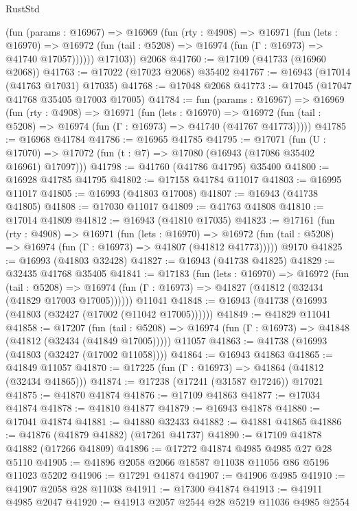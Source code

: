 \begin{lexlean}{RustStd}
\begin{coremodule}
          (fun (params : @16967) =>
          @16969
            (fun (rty : @4908) =>
            @16971
              (fun (lets : @16970) =>
              @16972 (fun (tail : @5208) => @16974 (fun (Γ : @16973) => @41740 @17057))))))
        @17103))
    @2068
@41760 := @17109 (@41733 (@16960 @2068))
@41763 := @17022 (@17023 @2068) @35402
@41767 := @16943 (@17014 (@41763 @17031) @17035)
@41768 := @17048 @2068
@41773 := @17045 (@17047 @41768 @35405 @17003 @17005)
@41784 := fun (params : @16967) =>
  @16969
    (fun (rty : @4908) =>
    @16971
      (fun (lets : @16970) =>
      @16972 (fun (tail : @5208) => @16974 (fun (Γ : @16973) => @41740 (@41767 @41773)))))
@41785 := @16968 @41784
@41786 := @16965 @41785
@41795 := @17071
    (fun (U : @17070) => @17072 (fun (t : @7) => @17080 (@16943 (@17086 @35402 @16961) @17097)))
@41798 := @41760 (@41786 @41795) @35400
@41800 := @16928 @41785 @41795
@41802 := @17158 @41784 @11017
@41803 := @16995 @11017
@41805 := @16993 (@41803 @17008)
@41807 := @16943 (@41738 @41805)
@41808 := @17030 @11017
@41809 := @41763 @41808
@41810 := @17014 @41809
@41812 := @16943 (@41810 @17035)
@41823 := @17161
    (fun (rty : @4908) =>
    @16971
      (fun (lets : @16970) =>
      @16972 (fun (tail : @5208) => @16974 (fun (Γ : @16973) => @41807 (@41812 @41773)))))
    @9170
@41825 := @16993 (@41803 @32428)
@41827 := @16943 (@41738 @41825)
@41829 := @32435 @41768 @35405
@41841 := @17183
    (fun (lets : @16970) =>
    @16972
      (fun (tail : @5208) =>
      @16974 (fun (Γ : @16973) => @41827 (@41812 (@32434 (@41829 @17003 @17005))))))
    @11041
@41848 := @16943 (@41738 (@16993 (@41803 (@32427 (@17002 (@11042 @17005))))))
@41849 := @41829 @11041
@41858 := @17207
    (fun (tail : @5208) => @16974 (fun (Γ : @16973) => @41848 (@41812 (@32434 (@41849 @17005)))))
    @11057
@41863 := @41738 (@16993 (@41803 (@32427 (@17002 @11058))))
@41864 := @16943 @41863
@41865 := @41849 @11057
@41870 := @17225 (fun (Γ : @16973) => @41864 (@41812 (@32434 @41865)))
@41874 := @17238 (@17241 (@31587 @17246)) @17021
@41875 := @41870 @41874
@41876 := @17109 @41863
@41877 := @17034 @41874
@41878 := @41810 @41877
@41879 := @16943 @41878
@41880 := @17041 @41874
@41881 := @41880 @32433
@41882 := @41881 @41865
@41886 := @41876 (@41879 @41882) (@17261 @41737)
@41890 := @17109 @41878 @41882 (@17266 @41809)
@41896 := @17272 @41874 @4985 @4985 @27 @28 @5110
@41905 := @41896 @2058 @2066 @18587 @11038 @11056 @86 @5196 @11023 @5202
@41906 := @17291 @41874
@41907 := @41906 @4985
@41910 := @41907 @2058 @28 @11038
@41911 := @17300 @41874
@41913 := @41911 @4985 @2047
@41920 := @41913 @2057 @2544 @28 @5219 @11036 @4985 @2554

\end{coremodule}
\end{lexlean}
